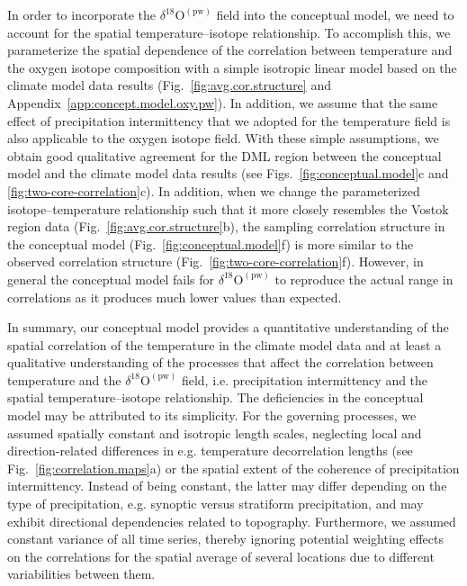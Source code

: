 \documentclass[cp]{copernicus}
\begin{document}
In order to incorporate the $\delta^{18}\mathrm{O}^{\mathrm{(pw)}}$ field into
the conceptual model, we need to account for the spatial temperature--isotope
relationship. To accomplish this, we parameterize the spatial dependence of the
correlation between temperature and the oxygen isotope composition with a simple
isotropic linear model based on the climate model data results
(Fig.~\ref{fig:avg.cor.structure} and
Appendix~\ref{app:concept.model.oxy.pw}). In addition, we assume that the same
effect of precipitation intermittency that we adopted for the temperature field
is also applicable to the oxygen isotope field. With these simple assumptions,
we obtain good qualitative agreement for the DML region between the conceptual
model and the climate model data results (see Figs.~\ref{fig:conceptual.model}c
and \ref{fig:two-core-correlation}c). In addition, when we change the
parameterized isotope--temperature relationship such that it more closely
resembles the Vostok region data (Fig.~\ref{fig:avg.cor.structure}b), the
sampling correlation structure in the conceptual model
(Fig.~\ref{fig:conceptual.model}f) is more similar to the observed correlation
structure (Fig.~\ref{fig:two-core-correlation}f). However, in general the
conceptual model fails for $\delta^{18}\mathrm{O}^{\mathrm{(pw)}}$ to reproduce
the actual range in correlations as it produces much lower values than expected.

In summary, our conceptual model provides a quantitative understanding of the
spatial correlation of the temperature in the climate model data and at least a
qualitative understanding of the processes that affect the correlation between
temperature and the $\delta^{18}\mathrm{O}^{\mathrm{(pw)}}$ field, i.e.
precipitation intermittency and the spatial temperature--isotope
relationship. The deficiencies in the conceptual model may be attributed to its
simplicity. For the governing processes, we assumed spatially constant and
isotropic length scales, neglecting local and direction-related differences in
e.g. temperature decorrelation lengths (see Fig.~\ref{fig:correlation.maps}a) or
the spatial extent of the coherence of precipitation intermittency. Instead of
being constant, the latter may differ depending on the type of precipitation,
e.g. synoptic versus stratiform precipitation, and may exhibit directional
dependencies related to topography. Furthermore, we assumed constant variance of
all time series, thereby ignoring potential weighting effects on the
correlations for the spatial average of several locations due to different
variabilities between them.
\end{document}
